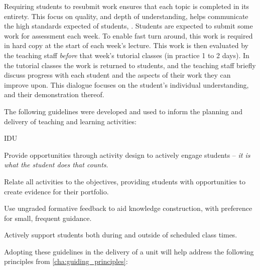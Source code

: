 Requiring students to resubmit work ensures that each topic is completed in its entirety. This focus on quality, and depth of understanding, helps communicate the high standards expected of students, . Students are expected to submit some work for assessment each week. To enable fast turn around, this work is required in hard copy at the start of each week's lecture. This work is then evaluated by the teaching staff \emph{before} that week's tutorial classes (in practice 1 to 2 days). In the tutorial classes the work is returned to students, and the teaching staff briefly discuss progress with each student and the aspects of their work they can improve upon. This dialogue focuses on the student's individual understanding, and their demonstration thereof.

The following guidelines were developed and used to inform the planning and delivery of teaching and learning activities:

%
% 

\begin{guidelines}{IDU}
  \item \label{itm:idu_active} Provide opportunities through activity design to actively engage students -- \emph{it is what the student does that counts}.  
  \item \label{itm:idu_align} Relate all activities to the objectives, providing students with opportunities to create evidence for their portfolio.
  \item \label{itm:idu_formative} Use ungraded formative feedback to aid knowledge construction, with preference for small, frequent guidance.
  \item \label{itm:idu_support} Actively support students both during and outside of scheduled class times. 
\end{guidelines}

Adopting these guidelines in the delivery of a unit will help address the following principles from \cref{cha:guiding_principles}:

